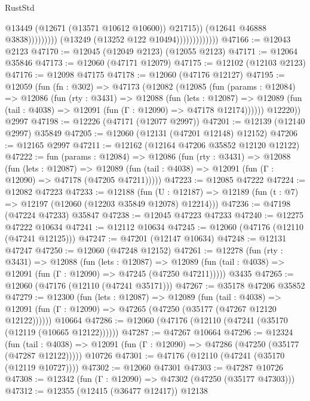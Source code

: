 \begin{lexlean}{RustStd}
\begin{coremodule}
                                              @13449
                                              (@12671 (@13571 @10612 @10600))
                                              @21715))
                                          (@12641 @46888 @3838)))))))))
                          (@13249 (@13252 @122 @10494)))))))))))))
@47166 := @12043 @2123
@47170 := @12045 (@12049 @2123) (@12055 @2123)
@47171 := @12064 @35846
@47173 := @12060 (@47171 @12079)
@47175 := @12102 (@12103 @2123)
@47176 := @12098 @47175
@47178 := @12060 (@47176 @12127)
@47195 := @12059
    (fun (fn : @302) =>
    @47173
      (@12082
        (@12085
          (fun (params : @12084) =>
          @12086
            (fun (rty : @3431) =>
            @12088
              (fun (lets : @12087) =>
              @12089 (fun (tail : @4038) => @12091 (fun (Γ : @12090) => @47178 @12174))))))
        @12220))
    @2997
@47198 := @12226 (@47171 (@12077 @2997))
@47201 := @12139 (@12140 @2997) @35849
@47205 := @12060 (@12131 (@47201 @12148) @12152)
@47206 := @12165 @2997
@47211 := @12162 (@12164 @47206 @35852 @12120 @12122)
@47222 := fun (params : @12084) =>
  @12086
    (fun (rty : @3431) =>
    @12088
      (fun (lets : @12087) =>
      @12089 (fun (tail : @4038) => @12091 (fun (Γ : @12090) => @47178 (@47205 @47211)))))
@47223 := @12085 @47222
@47224 := @12082 @47223
@47233 := @12188
    (fun (U : @12187) => @12189 (fun (t : @7) => @12197 (@12060 (@12203 @35849 @12078) @12214)))
@47236 := @47198 (@47224 @47233) @35847
@47238 := @12045 @47223 @47233
@47240 := @12275 @47222 @10634
@47241 := @12112 @10634
@47245 := @12060 (@47176 (@12110 (@47241 @12125)))
@47247 := @47201 (@12147 @10634)
@47248 := @12131 @47247
@47250 := @12060 (@47248 @12152)
@47261 := @12278
    (fun (rty : @3431) =>
    @12088
      (fun (lets : @12087) =>
      @12089 (fun (tail : @4038) => @12091 (fun (Γ : @12090) => @47245 (@47250 @47211)))))
    @3435
@47265 := @12060 (@47176 (@12110 (@47241 @35171)))
@47267 := @35178 @47206 @35852
@47279 := @12300
    (fun (lets : @12087) =>
    @12089
      (fun (tail : @4038) =>
      @12091 (fun (Γ : @12090) => @47265 (@47250 (@35177 (@47267 @12120 @12122))))))
    @10664
@47286 := @12060 (@47176 (@12110 (@47241 (@35170 (@12119 (@10665 @12122))))))
@47287 := @47267 @10664
@47296 := @12324
    (fun (tail : @4038) => @12091 (fun (Γ : @12090) => @47286 (@47250 (@35177 (@47287 @12122)))))
    @10726
@47301 := @47176 (@12110 (@47241 (@35170 (@12119 @10727))))
@47302 := @12060 @47301
@47303 := @47287 @10726
@47308 := @12342 (fun (Γ : @12090) => @47302 (@47250 (@35177 @47303)))
@47312 := @12355 (@12415 (@36477 @12417)) @12138

\end{coremodule}
\end{lexlean}
